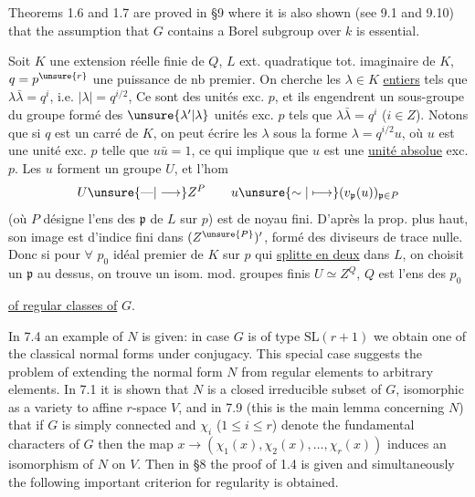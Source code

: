 Theorems 1.6 and 1.7 are proved in \S9 where it is also shown (see 9.1 and 9.10) that the assumption that $G$ contains a Borel subgroup over $k$ is essential.



Soit $K$ une extension   réelle finie de $Q$, $L$ ext. quadratique tot. imaginaire de $K$, $q=p^{\unsure{r}}$ une puissance de nb premier. On cherche les $\lambda\in K$ \uline{entiers} tels que $\lambda\bar\lambda=q^i$, i.e. $|\lambda|=q^{i/2}$,  Ce sont des unités exc. $p$, et ils engendrent  un sous-groupe du groupe  formé des $\unsure{\lambda'|\lambda}$ unités exc. $p$ tels que $\lambda\bar\lambda=q^i$ ($i\in Z$). Notons que  si $q$ est un carré de $K$, on peut écrire les $\lambda$ sous la forme $\lambda=q^{i/2}u$, où $u$ est une unité exc. $p$ telle que $u\bar u=1$, ce qui implique que $u$ est une \uline{unité absolue} exc. $p$. Les $u$ forment un groupe $U$, et l'hom
\[
U\unsure{\text{—}|\longrightarrow} Z^P\qquad u\unsure{\sim|\longmapsto}(v_{\mathfrak p}(u))_{\mathfrak p\in P}
\]
(où $P$ désigne l'ens des $\mathfrak p$ de $L$ sur $p$) est de noyau fini. D'après la prop. plus haut, son image est  d'indice fini dans $(Z^{\unsure{P}})'$,  formé des diviseurs de trace  nulle. Donc si pour $\forall$ $p_0$  idéal premier de $K$ sur $p$ qui \uline{splitte en deux} dans $L$, on choisit un $\mathfrak p$ au dessus, on trouve un isom. mod. groupes finis $U\simeq Z^Q$, $Q$ est l'ens des $p_0$



\uline{of regular classes of} $G$.

In 7.4 an example of $N$ is given: in case $G$ is of type $\mathrm{SL}(r+1)$ we obtain one of the classical normal forms under conjugacy. This special case suggests the problem of extending the normal form $N$ from regular elements to arbitrary elements. In 7.1 it is shown that $N$ is a closed irreducible subset of $G$, isomorphic as a variety to affine $r$-space $V$, and in 7.9 (this is the main lemma concerning $N$) that if $G$ is simply connected and $\chi_i$ ($1\leq i\leq r$) denote the fundamental characters of $G$ then the map $x\to(\chi_1(x),\chi_2(x),\ldots,\chi_r(x))$ induces an isomorphism of $N$ on $V$. Then in \S8 the proof of 1.4 is given and simultaneously the following important criterion for regularity is obtained.

